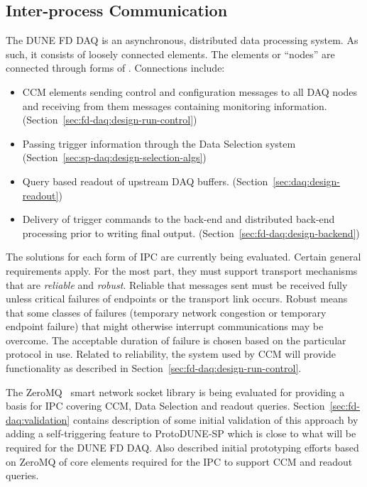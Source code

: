 \subsection{Inter-process Communication}
\label{sec:daq:design-ipc}

The DUNE FD DAQ is an asynchronous, distributed data processing system. 
As such, it consists of loosely connected elements.
The elements or ``nodes'' are connected through forms of .
Connections include:

\begin{itemize}
\item CCM elements sending control and configuration messages to all DAQ nodes and receiving from them messages containing monitoring information.  (Section~\ref{sec:fd-daq:design-run-control})
\item Passing trigger information through the Data Selection system (Section~\ref{sec:sp-daq:design-selection-algs})
\item Query based readout of upstream DAQ buffers. (Section~\ref{sec:daq:design-readout})
\item Delivery of trigger commands to the back-end and distributed back-end processing prior to writing final output. (Section~\ref{sec:fd-daq:design-backend})
\end{itemize}

The solutions for each form of IPC are currently being evaluated. 
Certain general requirements apply.
For the most part, they must support transport mechanisms that are \textit{reliable} and \textit{robust}. 
Reliable that messages sent must be received fully unless critical failures of endpoints or the transport link occurs.  Robust means that some classes of failures (temporary network congestion or temporary endpoint failure) that might otherwise interrupt communications may be overcome.
The acceptable duration of failure is chosen based on the particular protocol in use.
Related to reliability, the   system used by CCM will provide  functionality as described in Section~\ref{sec:fd-daq:design-run-control}.

The ZeroMQ~\cite{zeromq} smart network socket library is being evaluated for providing a basis for IPC covering CCM, Data Selection and readout queries.  
Section~\ref{sec:fd-daq:validation} contains description of some initial validation of this approach by adding a self-triggering feature to ProtoDUNE-SP which is close to what will be required for the DUNE FD DAQ.  Also described initial prototyping efforts based on ZeroMQ of core elements required for the IPC to support CCM and readout queries.

